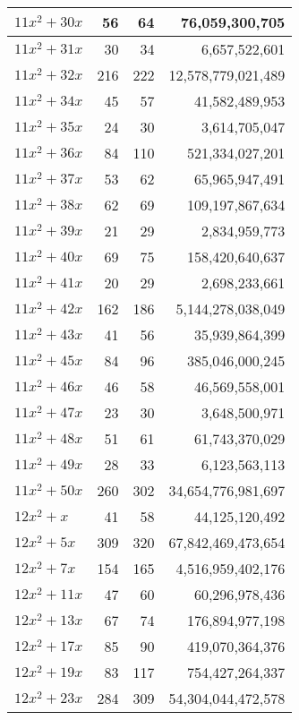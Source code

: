 \documentclass[a4paper]{amsproc}
\theoremstyle{plain}
\begin{document}
\begin{longtable}{ | l | r | r | r | }
$11x^2 + 30x$ & 56 & 64 & 76{,}059{,}300{,}705 \\ \hline
$11x^2 + 31x$ & 30 & 34 & 6{,}657{,}522{,}601 \\ \hline
$11x^2 + 32x$ & 216 & 222 & 12{,}578{,}779{,}021{,}489 \\ \hline
$11x^2 + 34x$ & 45 & 57 & 41{,}582{,}489{,}953 \\ \hline
$11x^2 + 35x$ & 24 & 30 & 3{,}614{,}705{,}047 \\ \hline
$11x^2 + 36x$ & 84 & 110 & 521{,}334{,}027{,}201 \\ \hline
$11x^2 + 37x$ & 53 & 62 & 65{,}965{,}947{,}491 \\ \hline
$11x^2 + 38x$ & 62 & 69 & 109{,}197{,}867{,}634 \\ \hline
$11x^2 + 39x$ & 21 & 29 & 2{,}834{,}959{,}773 \\ \hline
$11x^2 + 40x$ & 69 & 75 & 158{,}420{,}640{,}637 \\ \hline
$11x^2 + 41x$ & 20 & 29 & 2{,}698{,}233{,}661 \\ \hline
$11x^2 + 42x$ & 162 & 186 & 5{,}144{,}278{,}038{,}049 \\ \hline
$11x^2 + 43x$ & 41 & 56 & 35{,}939{,}864{,}399 \\ \hline
$11x^2 + 45x$ & 84 & 96 & 385{,}046{,}000{,}245 \\ \hline
$11x^2 + 46x$ & 46 & 58 & 46{,}569{,}558{,}001 \\ \hline
$11x^2 + 47x$ & 23 & 30 & 3{,}648{,}500{,}971 \\ \hline
$11x^2 + 48x$ & 51 & 61 & 61{,}743{,}370{,}029 \\ \hline
$11x^2 + 49x$ & 28 & 33 & 6{,}123{,}563{,}113 \\ \hline
$11x^2 + 50x$ & 260 & 302 & 34{,}654{,}776{,}981{,}697 \\ \hline
$12x^2 + x$ & 41 & 58 & 44{,}125{,}120{,}492 \\ \hline
$12x^2 + 5x$ & 309 & 320 & 67{,}842{,}469{,}473{,}654 \\ \hline
$12x^2 + 7x$ & 154 & 165 & 4{,}516{,}959{,}402{,}176 \\ \hline
$12x^2 + 11x$ & 47 & 60 & 60{,}296{,}978{,}436 \\ \hline
$12x^2 + 13x$ & 67 & 74 & 176{,}894{,}977{,}198 \\ \hline
$12x^2 + 17x$ & 85 & 90 & 419{,}070{,}364{,}376 \\ \hline
$12x^2 + 19x$ & 83 & 117 & 754{,}427{,}264{,}337 \\ \hline
$12x^2 + 23x$ & 284 & 309 & 54{,}304{,}044{,}472{,}578 \\ \hline

\end{longtable}
\end{document}
